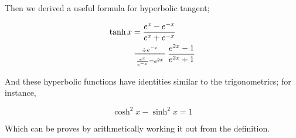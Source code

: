 \documentclass{article}
\begin{document}
\vspace{10pt}

Then we derived a useful formula for hyperbolic tangent;

\begin{align*}
\tanh x&=\frac{e^x-e^{-x}}{e^x+e^{-x}}\\
&\overset{\div e^{-x}}{\underset{\frac{e^x}{e^{-x}}=e^{2x}}{=\joinrel=\joinrel=\joinrel=\joinrel=\joinrel=}}\frac{e^{2x}-1}{e^{2x}+1}
\end{align*}

\vspace{10pt}

And these hyperbolic functions have identities similar to the trigonometrics; for instance,

\[\cosh^2x-\sinh^2x=1\]

\vspace{10pt}

Which can be proves by arithmetically working it out from the definition.
\end{document}
